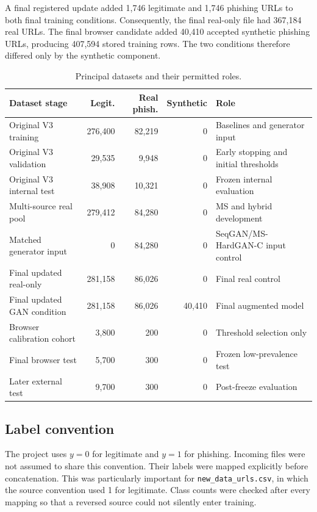 A final registered update added 1,746 legitimate and 1,746 phishing URLs to
both final training conditions. Consequently, the final real-only file had
367,184 real URLs. The final browser candidate added 40,410 accepted synthetic
phishing URLs, producing 407,594 stored training rows. The two conditions
therefore differed only by the synthetic component.

\begin{table}[htbp]
\centering
\caption{Principal datasets and their permitted roles.}
\label{tab:method-dataset-roles}
\small
\begin{tabular}{@{}p{}rrrp{}@{}}
\toprule
Dataset stage & Legit. & Real phish. & Synthetic & Role \\
\midrule
Original V3 training & 276,400 & 82,219 & 0 & Baselines and generator input \\
Original V3 validation & 29,535 & 9,948 & 0 & Early stopping and initial thresholds \\
Original V3 internal test & 38,908 & 10,321 & 0 & Frozen internal evaluation \\
Multi-source real pool & 279,412 & 84,280 & 0 & MS and hybrid development \\
Matched generator input & 0 & 84,280 & 0 & SeqGAN/MS-HardGAN-C input control \\
Final updated real-only & 281,158 & 86,026 & 0 & Final real control \\
Final updated GAN condition & 281,158 & 86,026 & 40,410 & Final augmented model \\
Browser calibration cohort & 3,800 & 200 & 0 & Threshold selection only \\
Final browser test & 5,700 & 300 & 0 & Frozen low-prevalence test \\
Later external test & 9,700 & 300 & 0 & Post-freeze evaluation \\
\bottomrule
\end{tabular}
\end{table}

\subsection{Label convention}

The project uses $y=0$ for legitimate and $y=1$ for phishing. Incoming files
were not assumed to share this convention. Their labels were mapped explicitly
before concatenation. This was particularly important for
\texttt{new\_data\_urls.csv}, in which the source convention used 1 for
legitimate. Class counts were checked after every mapping so that a reversed
source could not silently enter training.

